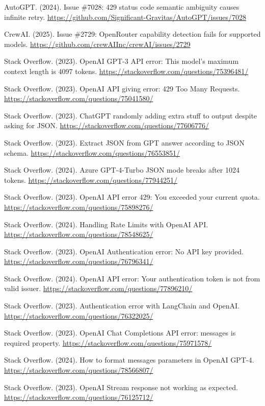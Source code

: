 \documentclass[11pt]{article}
\begin{document}
\begin{thebibliography}{99}
AutoGPT. (2024). Issue \#7028: 429 status code semantic ambiguity causes infinite retry. \url{https://github.com/Significant-Gravitas/AutoGPT/issues/7028}

CrewAI. (2025). Issue \#2729: OpenRouter capability detection fails for supported models. \url{https://github.com/crewAIInc/crewAI/issues/2729}

Stack Overflow. (2023). OpenAI GPT-3 API error: This model's maximum context length is 4097 tokens. \url{https://stackoverflow.com/questions/75396481/}

Stack Overflow. (2023). OpenAI API giving error: 429 Too Many Requests. \url{https://stackoverflow.com/questions/75041580/}

Stack Overflow. (2023). ChatGPT randomly adding extra stuff to output despite asking for JSON. \url{https://stackoverflow.com/questions/77606776/}

Stack Overflow. (2023). Extract JSON from GPT answer according to JSON schema. \url{https://stackoverflow.com/questions/76553851/}

Stack Overflow. (2024). Azure GPT-4-Turbo JSON mode breaks after 1024 tokens. \url{https://stackoverflow.com/questions/77944251/}

Stack Overflow. (2023). OpenAI API error 429: You exceeded your current quota. \url{https://stackoverflow.com/questions/75898276/}

Stack Overflow. (2024). Handling Rate Limits with OpenAI API. \url{https://stackoverflow.com/questions/78548625/}

Stack Overflow. (2023). OpenAI Authentication error: No API key provided. \url{https://stackoverflow.com/questions/76796341/}

Stack Overflow. (2024). OpenAI API error: Your authentication token is not from valid issuer. \url{https://stackoverflow.com/questions/77896210/}

Stack Overflow. (2023). Authentication error with LangChain and OpenAI. \url{https://stackoverflow.com/questions/76322025/}

Stack Overflow. (2023). OpenAI Chat Completions API error: messages is required property. \url{https://stackoverflow.com/questions/75971578/}

Stack Overflow. (2024). How to format messages parameters in OpenAI GPT-4. \url{https://stackoverflow.com/questions/78566807/}

Stack Overflow. (2023). OpenAI Stream response not working as expected. \url{https://stackoverflow.com/questions/76125712/}

\end{thebibliography}
\end{document}
